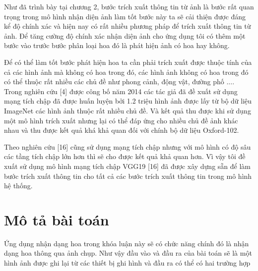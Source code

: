 \documentclass[12pt]{report}
\begin{document}
		Như đã trình bày tại chương 2, bước trích xuất thông tin từ ảnh là bước rất quan trọng trong mô hình nhận diện ảnh làm tốt bước này ta sẽ cải thiện được đáng kể độ chính xác và hiện nay có rất nhiều phương pháp để trích xuất thông tin từ ảnh. Để tăng cường độ chính xác nhận diện ảnh cho ứng dụng tôi có thêm một bước vào trước bước phân loại hoa đó là phát hiện ảnh có hoa hay không. 
												
		Để có thể làm tốt bước phát hiện hoa ta cần phải trích xuất được thuộc tính của cả các hình ảnh mà không có hoa trong đó, các hình ảnh không có hoa trong đó có thể thuộc rất nhiều các chủ đề như phong cảnh, động vật, đường phố .... Trong nghiên cứu [4] được công bố năm 2014 các tác giả đã đề xuất sử dụng mạng tích chập đã được huấn luyện bởi 1.2 triệu hình ảnh được lấy từ bộ dữ liệu ImageNet các hình ảnh thuộc rất nhiều chủ đề. Và kết quả thu được khi sử dụng một mô hình trích xuất nhưng lại có thể đáp ứng cho nhiều chủ đề ảnh khác nhau và thu được kết quả khá khả quan đối với chính bộ dữ liệu Oxford-102. 
												
		Theo nghiên cứu [16] cũng sử dụng mạng tích chập nhưng với mô hình có độ sâu các tầng tích chập lớn hơn thì sẽ cho được kết quả khả quan hơn. Vì vậy tôi đề xuất sử dụng mô hình mạng tích chập VGG19 [16] đã được xây dựng sẵn để làm bước trích xuất thông tin cho tất cả các bước trích xuất thông tin trong mô hình hệ thống.
												
		\section{Mô tả bài toán}
		Ứng dụng nhận dạng hoa trong khóa luận này sẽ có chức năng chính đó là nhận dạng hoa thông qua ảnh chụp. Như vậy đầu vào và đầu ra của bài toán sẽ là một hình ảnh được ghi lại từ các thiết bị ghi hình và đầu ra có thể có hai trường hợp																																																																			
																	
\end{document}
